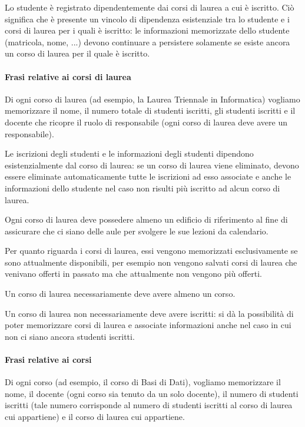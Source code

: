 \documentclass[a4paper,11pt]{article}
\begin{document}
Lo studente è registrato dipendentemente dai corsi di laurea a cui è iscritto. Ciò significa che è presente un vincolo di dipendenza esistenziale tra lo studente e i corsi di laurea per i quali è iscritto: le informazioni memorizzate dello studente (matricola, nome, ...) devono continuare a persistere solamente se esiste ancora un corso di laurea per il quale è iscritto.


\paragraph{Frasi relative ai corsi di laurea}

Di ogni corso di laurea (ad esempio, la Laurea Triennale in Informatica) vogliamo memorizzare il nome, il numero totale di studenti iscritti, gli studenti iscritti e il docente che ricopre il ruolo di responsabile (ogni corso di laurea deve avere un responsabile).

Le iscrizioni degli studenti e le informazioni degli studenti dipendono esistenzialmente dal corso di laurea: se un corso di laurea viene eliminato, devono essere eliminate automaticamente tutte le iscrizioni ad esso associate e anche le informazioni dello studente nel caso non risulti più iscritto ad alcun corso di laurea.

Ogni corso di laurea deve possedere almeno un edificio di riferimento al fine di assicurare che ci siano delle aule per svolgere le sue lezioni da calendario.

Per quanto riguarda i corsi di laurea, essi vengono memorizzati esclusivamente se sono attualmente disponibili, per esempio non vengono salvati corsi di laurea che venivano offerti in passato ma che attualmente non vengono più offerti.

Un corso di laurea necessariamente deve avere almeno un corso.

Un corso di laurea non necessariamente deve avere iscritti: si dà la possibilità di poter memorizzare corsi di laurea e associate informazioni anche nel caso in cui non ci siano ancora studenti iscritti.



\paragraph{Frasi relative ai corsi}

Di ogni corso (ad esempio, il corso di Basi di Dati), vogliamo memorizzare il nome, il docente (ogni corso sia tenuto da un solo docente), il numero di studenti iscritti (tale numero corrisponde al numero di studenti iscritti al corso di laurea cui appartiene) e il corso di laurea cui appartiene.
\end{document}
